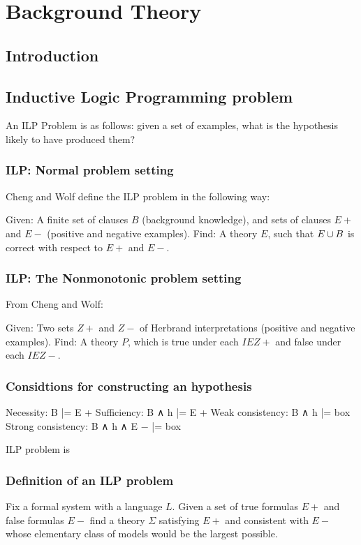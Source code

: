 
\chapter{Background Theory}

\label{ch:background}

\section{Introduction}

\section{Inductive Logic Programming problem}

An ILP Problem is as follows: given a set of examples, what is the hypothesis likely to have produced them?

\subsection{ILP: Normal problem setting}
Cheng and Wolf define the ILP problem in the following way:

Given: A finite set of clauses $B$ (background knowledge), and sets of clauses $E+$ and $E-$ (positive and negative examples).
Find: A theory $E$, such that $E \cup B$ is correct with respect to $E+$ and $E-$.

\subsection{ILP: The Nonmonotonic problem setting}
From Cheng and Wolf:

Given: Two sets $Z+$ and $Z-$ of Herbrand interpretations (positive and negative examples).
Find: A theory $P$, which is true under each $I E Z+$ and false
under each $I E Z-$.

\subsection{Considtions for constructing an hypothesis}
Necessity: B |= E +
Sufficiency: B ∧ h |= E +
Weak consistency: B ∧ h |= box
Strong consistency: B ∧ h ∧ E − |= box

ILP problem is 

\subsection{Definition of an ILP problem}
Fix a formal system with a language $L$. Given a set of true formulas $E+$ and false formulas $E-$ find a theory $\Sigma$ satisfying $E+$ and consistent with $E-$ whose elementary class of models would be the largest possible.